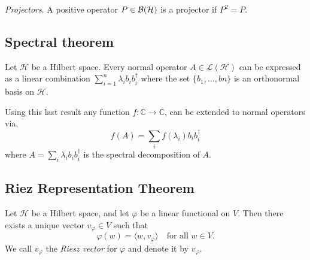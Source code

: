 \begin{definition}
  \emph{Projectors}. A positive operator $P \in \mathcal{B}(\mathcal{H})$ is a projector if $P^2 = P$.
\end{definition}





\subsection{Spectral theorem}

\begin{theorem}  \cite[Corollary 1.4 ]{watrous2018theory}
  Let $\mathcal{H}$ be a Hilbert space. Every normal operator $A \in \mathcal{L}(\mathcal{H})$ can be expressed as a linear combination $\sum_{i=1}^n \lambda_{i}b_{i}b_{i}^{\dag}$ where the set $\{b_{1}, \ldots , b{n}\}$ is an orthonormal basis on $\mathcal{H}$.
\end{theorem}

Using this last result any function $f:\mathbb{C} \xrightarrow{} \mathbb{C}$, can be extended to normal operators via,
  \begin{equation} \label{eq:apply_f_diag} 
    f(A) = \sum_{i} f(\lambda_{i})b_{i}b_{i}^{\dag}
\end {equation}
where $A = \sum_{i} \lambda_{i}b_{i}b_{i}^{\dag}$ is the spectral decomposition of $A$.

\subsection{Riez Representation Theorem}

\begin{definition} 
Let $\mathcal{H}$ be a Hilbert space, and let $\varphi$ be a linear functional on $V$. Then there exists a unique vector $v_\varphi \in V$ such that
$$
\varphi(w) = \langle w, v_\varphi \rangle \quad \text{for all } w \in V.
$$
We call $v_\varphi$ the \emph{Riesz vector} for $\varphi$ and denote it by $v_\varphi$.\\
\end{definition}




